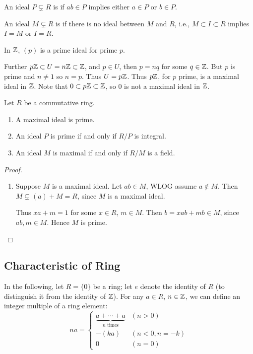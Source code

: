 \begin{definition}
An ideal $P\subsetneq R$ is  if $ab\in P$ implies either $a\in P$ or $b\in P$.

An ideal $M\subsetneq R$ is  if there is no ideal between $M$ and $R$, i.e., $M\subset I\subset R$ implies $I=M$ or $I=R$.
\end{definition}

\begin{example}
In $\mathbb Z$, $(p)$ is a prime ideal for prime $p$.

Further $p\mathbb Z\subset U=n\mathbb Z\subset\mathbb Z$, and $p\in U$, then $p=nq$ for some $q\in\mathbb Z$. But $p$ is prime and $n\neq1$ so $n=p$. Thus $U=p\mathbb Z$. Thus $p\mathbb Z$, for $p$ prime, is a maximal ideal in $\mathbb Z$. Note that $0\subset p\mathbb Z\subset\mathbb Z$, so $0$ is not a maximal ideal in $\mathbb Z$.
\end{example}

\begin{lemma}
Let $R$ be a commutative ring.
\begin{enumerate}[label=(\roman*)]
\item A maximal ideal is prime.
\item An ideal $P$ is prime if and only if $R/P$ is integral.
\item An ideal $M$ is maximal if and only if $R/M$ is a field.
\end{enumerate}
\end{lemma}

\begin{proof} \
\begin{enumerate}[label=(\roman*)]
\item Suppose $M$ is a maximal ideal. Let $ab\in M$, WLOG assume $a\notin M$. Then $M\subsetneq(a)+M=R$, since $M$ is a maximal ideal. 

Thus $xa+m=1$ for some $x\in R$, $m\in M$. Then $b=xab+mb\in M$, since $ab,m\in M$. Hence $M$ is prime.
\end{enumerate}
\end{proof}

\subsection{Characteristic of Ring}
In the following, let $R=\{0\}$ be a ring; let $e$ denote the identity of $R$ (to distinguish it from the identity of $\mathbb Z$). 
For any $a\in R$, $n\in\mathbb Z$, we can define an integer multiple of a ring element:
\[na=\begin{cases}
\underbrace{a+\cdots+a}_\text{$n$ times}&(n>0)\\
-(ka)&(n<0,n=-k)\\
0&(n=0)
\end{cases}\]

